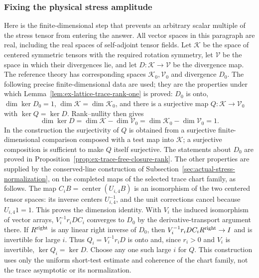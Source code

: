 \subsubsection{Fixing the physical stress amplitude}
Here is the finite-dimensional step that prevents an arbitrary scalar
multiple of the stress tensor from entering the answer. All vector spaces
in this paragraph are real, including the real spaces of self-adjoint
tensor fields. Let $\mathcal K$ be the space of centered symmetric tensors
with the required rotation symmetry, let $\mathcal V$ be the space in
which their divergences lie, and let
$D:\mathcal K\to\mathcal V$ be the divergence map. The reference theory
has corresponding spaces $\mathcal K_0,\mathcal V_0$ and divergence $D_0$.
The following precise finite-dimensional data are used; they are the
properties under which Lemma~\ref{lem:ex-lattice-trace-rank-one} is
proved: $D_0$ is onto, $\dim\ker D_0=1$,
$\dim\mathcal K=\dim\mathcal K_0$,
and there is a surjective map
$Q:\mathcal K\to\mathcal V_0$ with $\ker Q=\ker D$.
Rank--nullity then gives
\begin{equation}\label{eq:trace-conserved-rank}
 \dim\ker D=\dim\mathcal K-\dim\mathcal V_0
           =\dim\mathcal K_0-\dim\mathcal V_0=1.
\end{equation}
In the construction the surjectivity of $Q$ is obtained from a surjective
finite-dimensional comparison composed with a test map into $\mathcal K$;
a surjective composition is sufficient to make $Q$ itself surjective.
The statements about $D_0$ are proved in
Proposition~\ref{prop:ex-trace-free-closure-rank}. The other properties are supplied by the conserved-line construction
of Subsection~\ref{sec:actual-stress-normalization}, on the completed
maps of the selected trace chart family, as follows. The map
$C_iB=\operatorname{center}(U_{i,4}B)$ is an isomorphism of the two
centered tensor spaces: its inverse centers $U_{i,4}^{-1}$, and the
unit corrections cancel because $U_{i,4}1=1$. This proves the dimension
identity. With $V_i$ the induced isomorphism of vector arrays,
$V_i^{-1}r_iDC_i$ converges to $D_0$ by the derivative-transport
argument there. If $R^{\rm right}$ is any linear right inverse of $D_0$, then
$V_i^{-1}r_iDC_iR^{\rm right}\to I$ and is invertible for large $i$. Thus
$Q_i=V_i^{-1}r_iD$ is onto and, since $r_i>0$ and $V_i$ is invertible,
$\ker Q_i=\ker D$. Choose any one such large $i$ for $Q$.
This construction uses only the uniform short-test estimate and
coherence of the chart family, not the trace asymptotic or its normalization.

